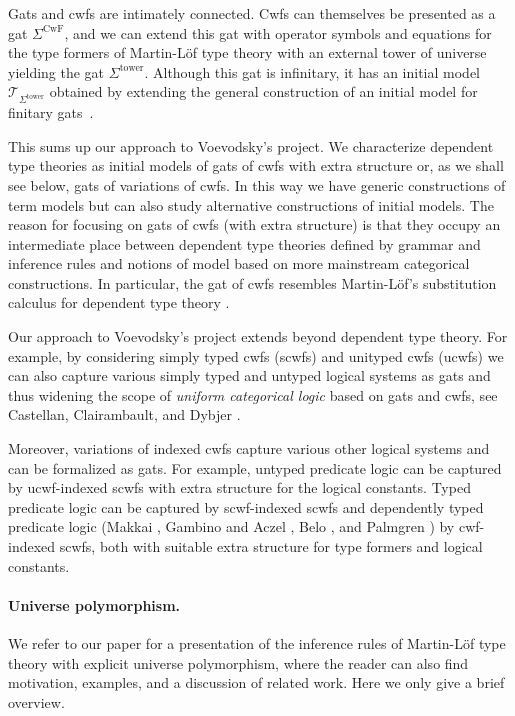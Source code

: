 \documentclass[submission,copyright,creativecommons]{eptcs}
\newcommand{\T}{\mathsf{T}}
\def\T{\mathcal{T}}
\def\CwF{\mathrm{CwF}}
\def\Sigmaext{{\Sigma^\mathrm{tower}}}
\begin{document}
Gats and cwfs are intimately connected. Cwfs can themselves be presented as a gat $\Sigma^\CwF$, and we can extend this gat with operator symbols and equations for the type formers of Martin-Löf type theory with an external tower of universe yielding the gat $\Sigmaext$. Although this gat is infinitary, it has an initial model $\T_{\Sigmaext}$  obtained by extending the general construction of an initial model for finitary gats~\cite[Section 5.7]{bezem:hofmann}.

This sums up our approach to Voevodsky's project. We characterize dependent type theories as initial models of gats of cwfs with extra structure or, as we shall see below, gats of variations of cwfs. In this way we have generic constructions of term models but can also study alternative constructions of initial models. The reason for focusing on gats of cwfs (with extra structure) is that they occupy an intermediate place between dependent type theories defined by grammar and inference rules and notions of model based on more mainstream categorical constructions. In particular, the gat of cwfs resembles Martin-Löf's substitution calculus for dependent type theory \cite{martinlof:gbg92,tasistro:lic}.

Our approach to Voevodsky's project extends beyond dependent type theory. For example, by considering simply typed cwfs (scwfs) and unityped cwfs (ucwfs) we can also capture various simply typed and untyped logical systems as gats and thus widening the scope of {\em uniform categorical logic} based on gats and cwfs, see Castellan, Clairambault, and Dybjer \cite{castellan:lambek}.

Moreover, variations of indexed cwfs capture various other logical systems and can be formalized as gats. For example, untyped predicate logic can be captured by ucwf-indexed scwfs with extra structure for the logical constants. Typed predicate logic can be captured by scwf-indexed scwfs and dependently typed predicate logic (Makkai \cite{makkai:folds}, Gambino and Aczel \cite{gambino-aczel}, Belo \cite{belo}, and Palmgren \cite{Palmgren19}) by cwf-indexed scwfs, both with suitable extra structure for type formers and logical constants.

\paragraph{Universe polymorphism.} We refer to our paper \cite{BezemCDE22} for a presentation of the inference rules of Martin-Löf type theory with explicit universe polymorphism, where the reader can also find motivation, examples, and a discussion of related work. Here we only give a brief overview.
\end{document}
